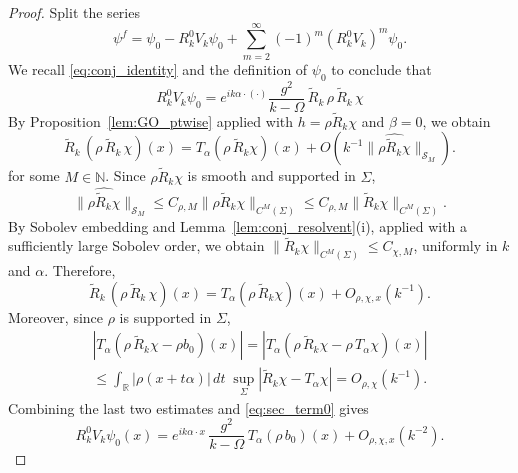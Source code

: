 \documentclass[12pt,a4paper]{amsart}
\numberwithin{equation}{section}
\theoremstyle{plain}
\theoremstyle{definition}
\begin{document}
\begin{proof}
Split the series
\begin{equation}\label{eq:split}
    \psi^{f}
    =
    \psi_0
    - R_k^0 V_k \psi_0
    + \sum_{m=2}^{\infty} (-1)^m (R_k^0 V_k)^m \psi_0.
\end{equation}
We recall \eqref{eq:conj_identity} and the definition of $\psi_0$ to conclude that
\begin{equation}\label{eq:sec_term0}
    R_k^0 V_k \psi_0 = e^{ik\alpha\cdot (\cdot)} \frac{g^2}{k - \Omega} \, \widetilde{R}_k \, \rho \,\widetilde{R}_k \, \chi
\end{equation}
By Proposition~\ref{lem:GO_ptwise} applied
with $h = \rho\widetilde{R}_k \chi$ and $\beta=0$, we obtain
\begin{equation*}
\widetilde{R}_k \, \left(\rho \,\widetilde{R}_k \, \chi\right) (x)
= T_\alpha\left(\rho \,\widetilde{R}_k\chi\right)(x) + O\left( k^{-1} \|\widehat{\rho\widetilde{R}_k \chi}\|_{\mathscr{S}_M}\right).
\end{equation*}
for some $M\in \mathbb{N}$. Since $\rho\widetilde{R}_k\chi$ is smooth and supported in $\Sigma$,
\[
\|\widehat{\rho\widetilde{R}_k\chi}\|_{\mathscr S_M}
\leq
C_{\rho,M}
\|\rho\widetilde{R}_k\chi\|_{C^M(\Sigma)}
\leq
C_{\rho,M}
\|\widetilde{R}_k\chi\|_{C^M(\Sigma)}.
\]
By Sobolev embedding and Lemma~\ref{lem:conj_resolvent}(i), applied with
a sufficiently large Sobolev order, we obtain $\|\widetilde{R}_k\chi\|_{C^M(\Sigma)}
\leq C_{\chi,M}$, uniformly in $k$ and $\alpha$. Therefore,
\begin{equation*}
\widetilde{R}_k \, \left(\rho \,\widetilde{R}_k \, \chi\right) (x)
= T_\alpha\left(\rho \,\widetilde{R}_k\chi\right)(x) + O_{\rho,\chi,x}(k^{-1}).
\end{equation*}
Moreover, since $\rho$ is supported in $\Sigma$,
\begin{multline*}
   \left|T_\alpha\left(\rho \,\widetilde{R}_k\chi - \rho b_0\right)(x) \right| = \left|T_\alpha\left(\rho \,\widetilde{R}_k\chi - \rho \, T_\alpha\chi\right)(x) \right|\\
   \leq \int_{\mathbb{R}}\bigl|\rho(x+t\alpha)\bigr|\,dt\;
\sup_{\Sigma}\left|\widetilde{R}_k\chi - T_\alpha\chi\right| = O_{\rho,\chi}(k^{-1}).
\end{multline*}
Combining the last two estimates and \eqref{eq:sec_term0} gives
\begin{equation}\label{eq:second_term}
    R_k^0 V_k \psi_0(x) = e^{ik\alpha\cdot x}\,
        \frac{g^2}{k - \Omega}\, T_\alpha(\rho\, b_0)(x)
        + O_{\rho,\chi,x}(k^{-2}).
\end{equation}


\end{proof}
\end{document}
